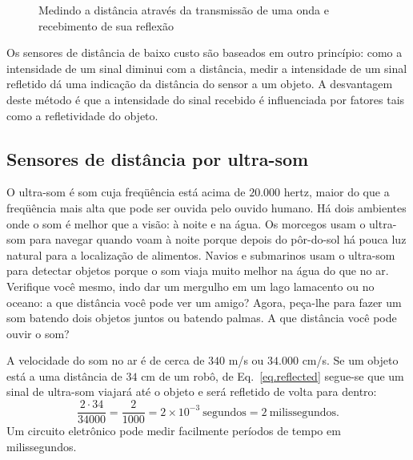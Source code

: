 \begin{figure}
\begin{center}
\end{center}
\caption{Medindo a distância através da transmissão de uma onda e recebimento de sua reflexão}\label{fig.measure-d}
\end{figure}

Os sensores de distância de baixo custo são baseados em outro princípio: como a intensidade de um sinal diminui com a distância, medir a intensidade de um sinal refletido dá uma indicação da distância do sensor a um objeto. A desvantagem deste método é que a intensidade do sinal recebido é influenciada por fatores tais como a refletividade do objeto.

\subsection{Sensores de distância por ultra-som}

O ultra-som é som cuja freqüência está acima de $20.000$ hertz, maior do que a freqüência mais alta que pode ser ouvida pelo ouvido humano. Há dois ambientes onde o som é melhor que a visão: à noite e na água. Os morcegos usam o ultra-som para navegar quando voam à noite porque depois do pôr-do-sol há pouca luz natural para a localização de alimentos. Navios e submarinos usam o ultra-som para detectar objetos porque o som viaja muito melhor na água do que no ar. Verifique você mesmo, indo dar um mergulho em um lago lamacento ou no oceano: a que distância você pode ver um amigo? Agora, peça-lhe para fazer um som batendo dois objetos juntos ou batendo palmas. A que distância você pode ouvir o som? 

A velocidade do som no ar é de cerca de $340$ m/s ou $34.000$ cm/s. Se um objeto está a uma distância de $34$ cm de um robô, de Eq.~\ref{eq.reflected} segue-se que um sinal de ultra-som viajará até o objeto e será refletido de volta para dentro:
\[\frac{2\cdot 34}{34000} = \frac{2}{1000} = 2\times 10^{-3}\  \textrm{segundos} = 2\  \textrm{milissegundos}.\]
Um circuito eletrônico pode medir facilmente períodos de tempo em milissegundos.


